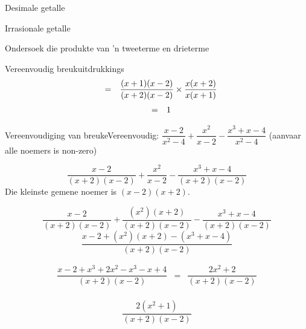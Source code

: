 \begin{Aktiwiteit}{Desimale getalle}
\begin{aktiwiteit}{Irrasionale getalle}
\begin{aktiwiteit}{Ondersoek die produkte van 'n tweeterme en drieterme}
\begin{wex}{Vereenvoudig breukuitdrukkings }
{\begin{equation*}
\begin{array}{ccc}& =& \dfrac{(x+1)(x-2)}{(x+2)(x-2)}\ensuremath{\times}\dfrac{x(x+2)}{x(x+1)}\hfill \end{array}
\end{equation*}
\begin{equation*}
\begin{array}{ccc}& =& 1\hfill \end{array}
\end{equation*}
}
\end{wex}


%      
\begin{wex}{Vereenvoudiging van breuke}{Vereenvoudig: $\dfrac{x-2}{{x}^{2}-4}+\dfrac{{x}^{2}}{x-2}-\dfrac{{x}^{3}+x-4}{{x}^{2}-4}$ 
(aanvaar alle noemers is non-zero)}
{
\begin{equation*}
\frac{x-2}{(x+2)(x-2)}+\frac{{x}^{2}}{x-2}-\frac{{x}^{3}+x-4}{(x+2)(x-2)}
\end{equation*}
 Die kleinste gemene noemer is $(x-2)(x+2)$.\par 

\begin{equation*}
\frac{x-2}{(x+2)(x-2)}+\frac{({x}^{2})
(x+2)}{(x+2)(x-2)}-\frac{{x}^{3}+x-4}{(x+2)(x-2)}
\end{equation*}
\begin{equation*}
\frac{x-2+({x}^{2})(x+2)-(x^{3}+x-4)}{(x+2)(x-2)}
\end{equation*}

\begin{equation*}
 \begin{array}{llll}
\dfrac{x-2+{x}^{3}+ 2x^{2}-x^{3} - x+4}{(x+2)(x-2)} & = & \dfrac{2x^{2} + 2}{(x+2)(x-2)}\\
\end{array}
\end{equation*}

\begin{equation*}
\dfrac{2({x}^{2}
+1)}{(x+2)(x-2)}
\end{equation*}
}
\end{wex}


\end{aktiwiteit}
\end{aktiwiteit}
\end{Aktiwiteit}
